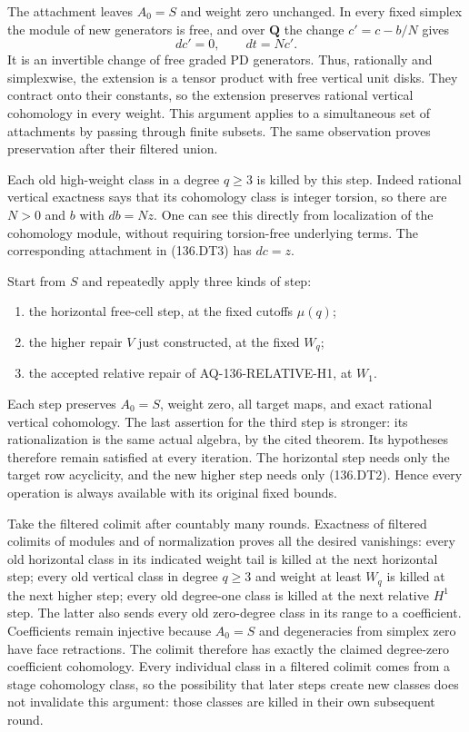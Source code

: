 The attachment leaves $A_0=S$ and weight zero unchanged.  In every
fixed simplex the module of new generators is free, and over
$\mathbf Q$ the change $c'=c-b/N$ gives
\[
                       dc'=0,\qquad dt=Nc'.
\]
It is an invertible change of free graded PD generators.  Thus,
rationally and simplexwise, the extension is a tensor product
with free vertical unit disks.  They contract onto their constants,
so the extension preserves rational vertical cohomology in every
weight.  This argument applies to a simultaneous set of attachments
by passing through finite subsets.  The same observation proves
preservation after their filtered union.

Each old high-weight class in a degree $q\geq3$ is killed by this
step.  Indeed rational vertical exactness says that its cohomology
class is integer torsion, so there are $N>0$ and $b$ with $db=Nz$.
One can see this directly from localization of the cohomology
module, without requiring torsion-free underlying terms.  The
corresponding attachment in (136.DT3) has $dc=z$.

Start from $S$ and repeatedly apply three kinds of step:
\begin{enumerate}
 \item the horizontal free-cell step, at the fixed cutoffs $\mu(q)$;
 \item the higher repair $V$ just constructed, at the fixed $W_q$;
 \item the accepted relative repair of AQ-136-RELATIVE-H1, at $W_1$.
\end{enumerate}
Each step preserves $A_0=S$, weight zero, all target maps, and exact
rational vertical cohomology.  The last assertion for the third
step is stronger: its rationalization is the same actual algebra,
by the cited theorem.  Its hypotheses therefore remain satisfied
at every iteration.  The horizontal step needs only the target
row acyclicity, and the new higher step needs only (136.DT2).
Hence every operation is always available with its original fixed
bounds.

Take the filtered colimit after countably many rounds.  Exactness
of filtered colimits of modules and of normalization proves all
the desired vanishings: every old horizontal class in its indicated
weight tail is killed at the next horizontal step; every old
vertical class in degree $q\geq3$ and weight at least $W_q$ is killed
at the next higher step; every old degree-one class is killed at
the next relative $H^1$ step.  The latter also sends every old
zero-degree class in its range to a coefficient.  Coefficients
remain injective because $A_0=S$ and degeneracies from simplex
zero have face retractions.  The colimit therefore has exactly
the claimed degree-zero coefficient cohomology.  Every individual
class in a filtered colimit comes from a stage cohomology class,
so the possibility that later steps create new classes does not
invalidate this argument: those classes are killed in their own
subsequent round.

